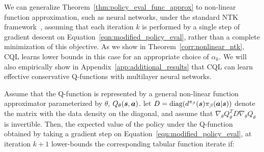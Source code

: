 We can generalize Theorem~\ref{thm:policy_eval_func_approx} to non-linear function approximation, such as neural networks, {under the standard NTK framework~\citep{ntk}}, assuming that each iteration $k$ is performed by a single step of gradient descent on Equation~\ref{eqn:modified_policy_eval}, rather than a complete minimization of this objective. As we show in Theorem~\ref{corr:nonlinear_ntk}, CQL learns lower bounds in this case for an appropriate choice of $\alpha_k$. We will also empirically show in Appendix~\ref{app:additional_results} that CQL can learn effective conservative Q-functions with multilayer neural networks.

\begin{theorem}
\label{corr:nonlinear_ntk}
Assume that the Q-function is represented by a general non-linear function approximator parameterized by $\theta$, $Q_\theta(\boldsymbol{s}, \boldsymbol{a})$. let $D = \text{diag}(d^{\pi_\beta}(\boldsymbol{s}) {\pi_\beta}(\boldsymbol{a}|\boldsymbol{s}))$ denote the matrix with the data density on the diagonal, and assume that $\nabla_\theta Q_\theta^T D \nabla_\theta Q_\theta$ is invertible. Then, the expected value of the policy under the Q-function obtained by taking a gradient step on Equation~\ref{eqn:modified_policy_eval}, at iteration $k+1$ lower-bounds the corresponding tabular function iterate if: 
\end{theorem}

